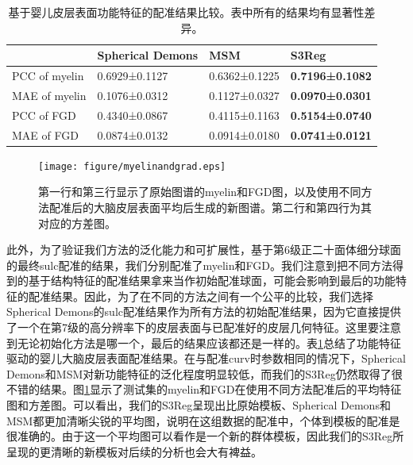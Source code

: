 \begin{table}[h]
		\caption{基于婴儿皮层表面功能特征的配准结果比较。表中所有的结果均有显著性差异。}
		\label{tab:婴儿皮层表面功能特征配准结果}
		\centering
		\begin{tabularx}{0.9\columnwidth}{X<{\centering}|X<{\centering}|X<{\centering}|X<{\centering}}
			\hline
			& Spherical Demons &	MSM	& S3Reg  \\
		    \hline
			PCC of myelin              &	0.6929±0.1127	 &  0.6362±0.1225 &	\textbf{0.7196±0.1082} \\
			MAE of myelin              &	0.1076±0.0312    &	0.1127±0.0327 &	\textbf{0.0970±0.0301} \\
			PCC of FGD    &	0.4340±0.0867    &	0.4115±0.1163 &	\textbf{0.5154±0.0740} \\
			MAE of FGD	   &    0.0874±0.0132    &	0.0914±0.0180 &	\textbf{0.0741±0.0121} \\	
			\hline
		\end{tabularx}
\end{table}

\begin{figure}[h]
	\centering
	\texttt{[image: figure/myelinandgrad.eps]}
	\caption{第一行和第三行显示了原始图谱的myelin和FGD图，以及使用不同方法配准后的大脑皮层表面平均后生成的新图谱。第二行和第四行为其对应的方差图。}
	\label{fig:myelinandgrad}
\end{figure}

此外，为了验证我们方法的泛化能力和可扩展性，基于第6级正二十面体细分球面的最终sulc配准的结果，我们分别配准了myelin和FGD。我们注意到把不同方法得到的基于结构特征的配准结果拿来当作初始配准球面，可能会影响到最后的功能特征的配准结果。因此，为了在不同的方法之间有一个公平的比较，我们选择Spherical Demons的sulc配准结果作为所有方法的初始配准结果，因为它直接提供了一个在第7级的高分辨率下的皮层表面与已配准好的皮层几何特征。这里要注意到无论初始化方法是哪一个，最后的结果应该都还是一样的。表\ref{tab:婴儿皮层表面功能特征配准结果}总结了功能特征驱动的婴儿大脑皮层表面配准结果。在与配准curv时参数相同的情况下，Spherical Demons和MSM对新功能特征的泛化程度明显较低，而我们的S3Reg仍然取得了很不错的结果。图\ref{fig:myelinandgrad}显示了测试集的myelin和FGD在使用不同方法配准后的平均特征图和方差图。可以看出，我们的S3Reg呈现出比原始模板、Spherical Demons和MSM都更加清晰尖锐的平均图，说明在这组数据的配准中，个体到模板的配准是很准确的。由于这一个平均图可以看作是一个新的群体模板，因此我们的S3Reg所呈现的更清晰的新模板对后续的分析也会大有裨益。

